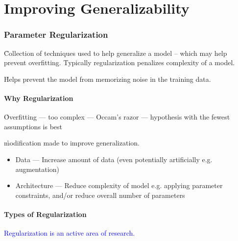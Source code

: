 \chapter{Improving Generalizability}

\subsection{Parameter Regularization}

\r{Collection of techniques used to help generalize a model -- which may help prevent overfitting. Typically regularization penalizes complexity of a model.}


\r{Helps prevent the model from memorizing noise in the training data.}


\subsubsection{Why Regularization}

\r{Overfitting --- too complex --- Occam's razor --- hypothesis with the fewest assumptions is best}

\r{modification made to improve generalization.}

\begin{itemize}[noitemsep,topsep=0pt]
	\item Data --- Increase amount of data (even potentially artificially e.g. augmentation)
	\item Architecture --- Reduce complexity of model e.g. applying parameter constraints, and/or reduce overall number of parameters
\end{itemize}


\subsubsection{Types of Regularization}

\textcolor{blue}{Regularization is an active area of research.}


